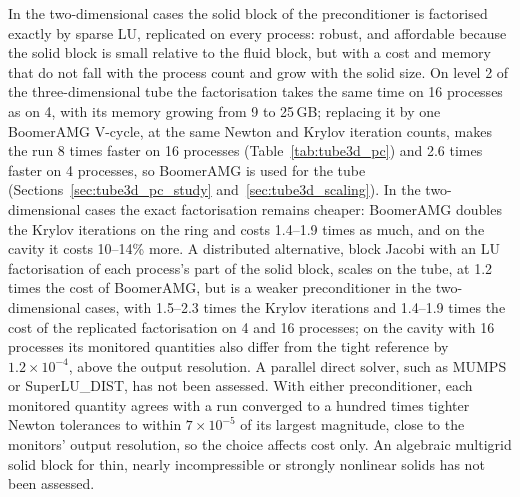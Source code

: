 In the two-dimensional cases the solid block of the preconditioner is factorised exactly by sparse LU, replicated on every process: robust, and affordable because the solid block is small relative to the fluid block, but with a cost and memory that do not fall with the process count and grow with the solid size.
On level 2 of the three-dimensional tube the factorisation takes the same time on 16 processes as on 4, with its memory growing from 9 to 25\,GB; replacing it by one BoomerAMG V-cycle, at the same Newton and Krylov iteration counts, makes the run 8 times faster on 16 processes (Table~\ref{tab:tube3d_pc}) and 2.6 times faster on 4 processes, so BoomerAMG is used for the tube (Sections~\ref{sec:tube3d_pc_study} and~\ref{sec:tube3d_scaling}).
In the two-dimensional cases the exact factorisation remains cheaper: BoomerAMG doubles the Krylov iterations on the ring and costs 1.4--1.9 times as much, and on the cavity it costs 10--14\% more.
A distributed alternative, block Jacobi with an LU factorisation of each process's part of the solid block, scales on the tube, at 1.2 times the cost of BoomerAMG, but is a weaker preconditioner in the two-dimensional cases, with 1.5--2.3 times the Krylov iterations and 1.4--1.9 times the cost of the replicated factorisation on 4 and 16 processes; on the cavity with 16 processes its monitored quantities also differ from the tight reference by $1.2\times10^{-4}$, above the output resolution.
A parallel direct solver, such as MUMPS or SuperLU\_DIST, has not been assessed.
With either preconditioner, each monitored quantity agrees with a run converged to a hundred times tighter Newton tolerances to within $7\times10^{-5}$ of its largest magnitude, close to the monitors' output resolution, so the choice affects cost only.
An algebraic multigrid solid block for thin, nearly incompressible or strongly nonlinear solids has not been assessed.

